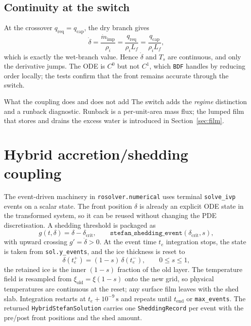 \documentclass[11pt,a4paper]{article}
\newcommand{\Ts}{T_s}
\newcommand{\Lf}{L_f}
\newcommand{\mdot}{\dot m}
\begin{document}
\subsection{Continuity at the switch}

At the crossover $q_{\mathrm{req}}=q_{\mathrm{cap}}$, the dry branch gives
\begin{equation}
  \dot\delta=\frac{\mdot_{\mathrm{imp}}}{\rho_i}
  =\frac{q_{\mathrm{req}}}{\rho_i\Lf}
  =\frac{q_{\mathrm{cap}}}{\rho_i\Lf},
\end{equation}
which is exactly the wet-branch value. Hence $\dot\delta$ and $\Ts$ are continuous, and
only the derivative jumps. The ODE is $C^0$ but not $C^1$, which \texttt{BDF} handles by
reducing order locally; the tests confirm that the front remains accurate through the
switch.

\begin{insightbox}{What the coupling does and does not add}
The switch adds the \emph{regime} distinction and a runback diagnostic. Runback is a
per-unit-area mass flux; the lumped film that stores and drains the excess water is
introduced in Section~\ref{sec:film}.
\end{insightbox}

\section{Hybrid accretion/shedding coupling}\label{sec:hybrid}

The event-driven machinery in \texttt{rosolver.numerical} uses terminal
\texttt{solve\_ivp} events on a scalar state. The front position $\delta$ is already an
explicit ODE state in the transformed system, so it can be reused without changing the
PDE discretisation. A shedding threshold is packaged as
\begin{equation}
  g(t,\delta)=\delta-\delta_{\mathrm{crit}},
  \qquad
  \texttt{stefan\_shedding\_event}(\delta_{\mathrm{crit}},s),
\end{equation}
with upward crossing $g'=\dot\delta>0$. At the event time $t_e$ integration stops, the
state is taken from \texttt{sol.y\_events}, and the ice thickness is reset to
\begin{equation}\label{eq:shedreset}
  \delta(t_e^+)=(1-s)\,\delta(t_e^-),\qquad 0\le s\le 1,
\end{equation}
the retained ice is the inner $(1-s)$ fraction of the old layer. The temperature field is
resampled from $\xi_{\mathrm{old}}=\xi(1-s)$ onto the new grid, so physical temperatures
are continuous at the reset; any surface film leaves with the shed slab. Integration
restarts at $t_e+10^{-9}\,\mathrm{s}$ and repeats until $t_{\mathrm{end}}$ or
\texttt{max\_events}. The returned \texttt{HybridStefanSolution} carries one
\texttt{SheddingRecord} per event with the pre/post front positions and the shed amount.
\end{document}
